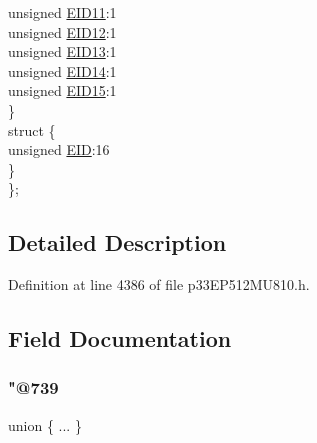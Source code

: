 \begin{DoxyCompactItemize}
\begin{tabbing}
\>\>unsigned \hyperlink{structtag_c1_r_x_f11_e_i_d_b_i_t_s_a710bdb0d602deb021b0be99066008018}{EID11}:1\\
\>\>unsigned \hyperlink{structtag_c1_r_x_f11_e_i_d_b_i_t_s_aa347bb85867bd8d4e0124f7cff8c6472}{EID12}:1\\
\>\>unsigned \hyperlink{structtag_c1_r_x_f11_e_i_d_b_i_t_s_a37d5f3edcbf6ef62f848fd4f3c584f79}{EID13}:1\\
\>\>unsigned \hyperlink{structtag_c1_r_x_f11_e_i_d_b_i_t_s_a7ffc0b0e0d99b8476b6f9a45337c17ab}{EID14}:1\\
\>\>unsigned \hyperlink{structtag_c1_r_x_f11_e_i_d_b_i_t_s_a293cd7dc1746257fa75a60cbd9383cd7}{EID15}:1\\
\>\} \\
\>struct \{\\
\>\>unsigned \hyperlink{structtag_c1_r_x_f11_e_i_d_b_i_t_s_ae80b378c9141f7c03e0b4e55b5f4b54d}{EID}:16\\
\>\} \\
\}; \\

\end{tabbing}\end{DoxyCompactItemize}


\subsection{Detailed Description}


Definition at line 4386 of file p33\+E\+P512\+M\+U810.\+h.



\subsection{Field Documentation}
\mbox{\label{structtag_c1_r_x_f11_e_i_d_b_i_t_s_ab8b03b20c757e9c541825d1e22376615}} 
\subsubsection{\texorpdfstring{"@739}{@739}}
{\footnotesize\ttfamily union \{ ... \} }

\mbox{\label{structtag_c1_r_x_f11_e_i_d_b_i_t_s_ae80b378c9141f7c03e0b4e55b5f4b54d}} 
